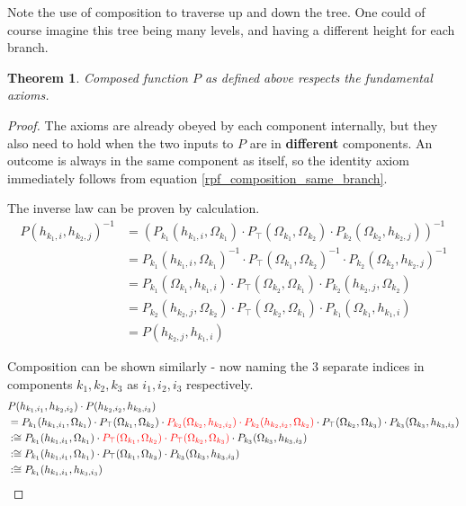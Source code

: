 \documentclass[twoside]{article}
\theoremstyle{plain}%
\newtheorem{theorem}{Theorem}[section]
\theoremstyle{definition}
\theoremstyle{remark}
\begin{document}
Note the use of composition to traverse up and down the tree. One could of course imagine this tree being many levels, and having a different height for each branch.

\begin{theorem}
Composed function \(P\) as defined above respects the fundamental axioms.
\end{theorem}

\begin{proof}
The axioms are already obeyed by each component internally, but they also need to hold when the two inputs to \(P\) are in \textbf{different} components. An outcome is always in the same component as itself, so the identity axiom immediately follows from equation \ref{rpf_composition_same_branch}.

The inverse law can be proven by calculation.
\begin{equation}
\begin{aligned}
P(h_{k_1, i}, h_{k_2, j})^{-1} &= (P_{k_1}(h_{k_1, i}, \Omega_{k_1}) \cdot  P_{\top}(\Omega_{k_1}, \Omega_{k_2}) \cdot P_{k_2}(\Omega_{k_2}, h_{k_2, j}))^{-1} \\
& = P_{k_1}(h_{k_1, i}, \Omega_{k_1})^{-1} \cdot  P_{\top}(\Omega_{k_1}, \Omega_{k_2})^{-1} \cdot P_{k_2}(\Omega_{k_2}, h_{k_2, j})^{-1} \\
& = P_{k_1}(\Omega_{k_1}, h_{k_1, i}) \cdot  P_{\top}(\Omega_{k_2}, \Omega_{k_1}) \cdot P_{k_2}(h_{k_2, j}, \Omega_{k_2}) \\
& = P_{k_2}(h_{k_2, j}, \Omega_{k_2})\cdot  P_{\top}(\Omega_{k_2}, \Omega_{k_1}) \cdot P_{k_1}(\Omega_{k_1}, h_{k_1, i}) \\
& = P(h_{k_2, j}, h_{k_1, i})
\end{aligned}
\end{equation}

Composition can be shown similarly - now naming the 3 separate indices in components \(k_1, k_2, k_3\) as \(i_1, i_2, i_3\) respectively.
\begin{equation}
\begin{aligned}
& P(h_{k_1, i_1}, h_{k_2, i_2}) \cdot P(h_{k_2, i_2}, h_{k_3, i_3}) \\
& = P_{k_1}(h_{k_1, i_1}, \Omega_{k_1}) \cdot  P_{\top}(\Omega_{k_1}, \Omega_{k_2}) \cdot \textcolor{red}{P_{k_2}(\Omega_{k_2}, h_{k_2, i_2}) \cdot  P_{k_2}(h_{k_2, i_2}, \Omega_{k_2})} \cdot  P_{\top}(\Omega_{k_2}, \Omega_{k_3}) \cdot P_{k_3}(\Omega_{k_3}, h_{k_3, i_3}) \\
& :\cong P_{k_1}(h_{k_1, i_1}, \Omega_{k_1}) \cdot  \textcolor{red}{P_{\top}(\Omega_{k_1}, \Omega_{k_2}) \cdot  P_{\top}(\Omega_{k_2}, \Omega_{k_3})} \cdot P_{k_3}(\Omega_{k_3}, h_{k_3, i_3}) \\
& :\cong P_{k_1}(h_{k_1, i_1}, \Omega_{k_1}) \cdot  P_{\top}(\Omega_{k_1}, \Omega_{k_3}) \cdot P_{k_3}(\Omega_{k_3}, h_{k_3, i_3}) \\
& :\cong P_{k_1}(h_{k_1, i_1}, h_{k_3, i_3})
\end{aligned}
\end{equation}
\end{proof}
\end{document}
